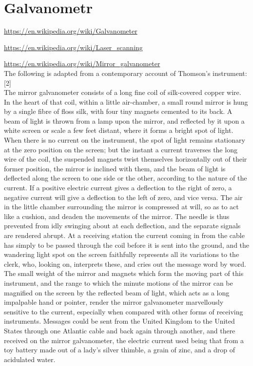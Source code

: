 \documentclass{template/socthesis}
\begin{document}
\section{Galvanometr}
\url{https://en.wikipedia.org/wiki/Galvanometer}

\url{https://en.wikipedia.org/wiki/Laser\_scanning}

\url{https://en.wikipedia.org/wiki/Mirror\_galvanometer} \\
The following is adapted from a contemporary account of Thomson's instrument:[2]\\
The mirror galvanometer consists of a long fine coil of silk-covered copper wire. In the heart of that coil, within a little air-chamber, a small round mirror is hung by a single fibre of floss silk, with four tiny magnets cemented to its back. A beam of light is thrown from a lamp upon the mirror, and reflected by it upon a white screen or scale a few feet distant, where it forms a bright spot of light. When there is no current on the instrument, the spot of light remains stationary at the zero position on the screen; but the instant a current traverses the long wire of the coil, the suspended magnets twist themselves horizontally out of their former position, the mirror is inclined with them, and the beam of light is deflected along the screen to one side or the other, according to the nature of the current. If a positive electric current gives a deflection to the right of zero, a negative current will give a deflection to the left of zero, and vice versa.
The air in the little chamber surrounding the mirror is compressed at will, so as to act like a cushion, and deaden the movements of the mirror. The needle is thus prevented from idly swinging about at each deflection, and the separate signals are rendered abrupt. At a receiving station the current coming in from the cable has simply to be passed through the coil before it is sent into the ground, and the wandering light spot on the screen faithfully represents all its variations to the clerk, who, looking on, interprets these, and cries out the message word by word. The small weight of the mirror and magnets which form the moving part of this instrument, and the range to which the minute motions of the mirror can be magnified on the screen by the reflected beam of light, which acts as a long impalpable hand or pointer, render the mirror galvanometer marvellously sensitive to the current, especially when compared with other forms of receiving instruments. Messages could be sent from the United Kingdom to the United States through one Atlantic cable and back again through another, and there received on the mirror galvanometer, the electric current used being that from a toy battery made out of a lady's silver thimble, a grain of zinc, and a drop of acidulated water.
\end{document}
